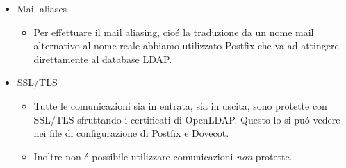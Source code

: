 \documentclass[9pt, a4paper, oneside]{article}
\begin{document}
\begin{itemize}
\begin{itemize}
							di virus mentre il 
							secondo per avvertire 
							il destinatario che si 
							tratta di spam.
						\item
							Per mettere in 
							comunicazione questi 
							due programmi con 
							Postfix abbaimo usato 
							\texttt{Amavis}\footnote{http://www.ijs.si/software/amavisd/}
					\end{itemize}
					\item
						Mail aliases
					\begin{itemize}
						\item
							Per effettuare il mail 
							aliasing, cio\'e la 
							traduzione da un nome 
							mail alternativo al 
							nome reale abbiamo 
							utilizzato Postfix che 
							va ad attingere 
							direttamente al 
							database LDAP.
					\end{itemize}
					\item
						SSL/TLS
					\begin{itemize}
						\item
							Tutte le comunicazioni 
							sia in entrata, sia in 
							uscita, sono protette 
							con SSL/TLS sfruttando 
							i certificati di 
							OpenLDAP. Questo lo si 
							pu\'o vedere nei file 
							di configurazione di 
							Postfix e Dovecot. 
						\item
							Inoltre non \'e 
							possibile utilizzare 
							comunicazioni 
							\emph{non} 
							protette.
					\end{itemize}
				\end{itemize}
\end{document}
